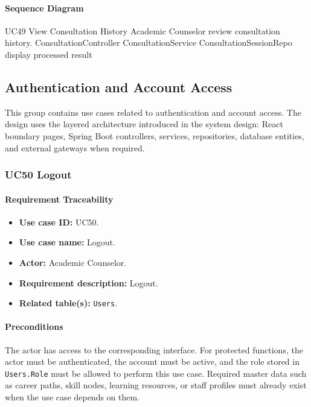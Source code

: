 \paragraph{Sequence Diagram}

\SequenceDiagram
{UC49 View Consultation History}
{Academic Counselor}
{review consultation history.}
{ConsultationController}
{ConsultationService}
{ConsultationSessionRepo}
{display processed result}

\subsection{Authentication and Account Access}

This group contains use cases related to authentication and account access. The design uses the layered architecture introduced in the system design: React boundary pages, Spring Boot controllers, services, repositories, database entities, and external gateways when required.

\subsubsection{UC50 Logout}

\paragraph{Requirement Traceability}

\begin{itemize}
    \item \textbf{Use case ID:} UC50.
    \item \textbf{Use case name:} Logout.
    \item \textbf{Actor:} Academic Counselor.
    \item \textbf{Requirement description:} Logout.
    \item \textbf{Related table(s):} \texttt{Users}.
\end{itemize}

\paragraph{Preconditions}

The actor has access to the corresponding interface. For protected functions, the actor must be authenticated, the account must be active, and the role stored in \texttt{Users.Role} must be allowed to perform this use case. Required master data such as career paths, skill nodes, learning resources, or staff profiles must already exist when the use case depends on them.

